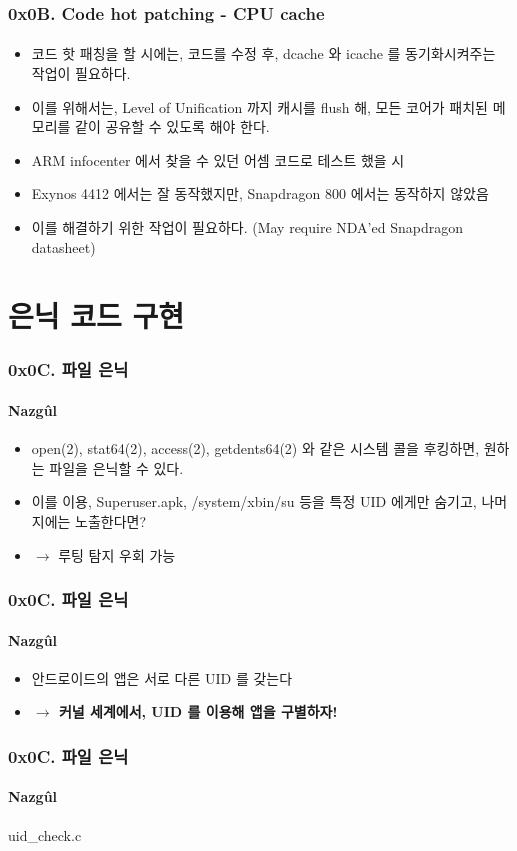 \begin{frame}
  \frametitle{0x0B. Code hot patching - CPU cache}
  \framesubtitle{}

  \begin{itemize}
  \item <1-> 코드 핫 패칭을 할 시에는, 코드를 수정 후, dcache 와 icache 를 동기화시켜주는 작업이 필요하다.
  \item <2-> 이를 위해서는, Level of Unification 까지 캐시를 flush 해, 모든 코어가 패치된 메모리를 같이 공유할 수 있도록 해야 한다.
  \item <3-> ARM infocenter 에서 찾을 수 있던 어셈 코드\cite{cp15c7,cache}로 테스트 했을 시
  \item <4-> Exynos 4412 에서는 잘 동작했지만, Snapdragon 800 에서는 동작하지 않았음
  \item <5-> 이를 해결하기 위한 작업이 필요하다. (May require NDA'ed Snapdragon datasheet)
  \end{itemize}
\end{frame}

\section[Section]{은닉 코드 구현}
\begin{frame}
  \frametitle{0x0C. 파일 은닉}
  \framesubtitle{Nazgûl}

  \begin{itemize}
  \item <1-> open(2), stat64(2), access(2), getdents64(2) 와 같은 시스템 콜을 후킹하면, 원하는 파일을 은닉할 수 있다.
  \item <2-> 이를 이용, Superuser.apk, /system/xbin/su 등을 특정 UID 에게만 숨기고, 나머지에는 노출한다면?
  \item <3-> $\rightarrow$ 루팅 탐지 우회 가능
  \end{itemize}
\end{frame}

\begin{frame}
  \frametitle{0x0C. 파일 은닉}
  \framesubtitle{Nazgûl}

  \begin{itemize}
  \item <1-> 안드로이드의 앱은 서로 다른 UID 를 갖는다
  \item <2-> \textbf{$\rightarrow$ 커널 세계에서, UID 를 이용해 앱을 구별하자!}
  \end{itemize}
\end{frame}

\begin{frame}
  \frametitle{0x0C. 파일 은닉}
  \framesubtitle{Nazgûl}

  {uid_check.c}
\end{frame}

